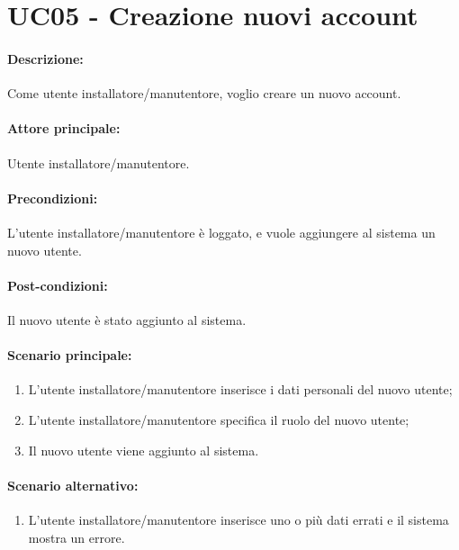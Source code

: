 \section{UC05 - Creazione nuovi account}

\paragraph{Descrizione:}
Come utente installatore/manutentore, voglio creare un nuovo account.

\paragraph{Attore principale:}
Utente installatore/manutentore.

\paragraph{Precondizioni:}
L'utente installatore/manutentore è loggato, e vuole aggiungere al sistema un nuovo utente.

\paragraph{Post-condizioni:}
Il nuovo utente è stato aggiunto al sistema.

\paragraph{Scenario principale:}
\begin{enumerate}
    \item L'utente installatore/manutentore inserisce i dati personali del nuovo utente; %
    \item L'utente installatore/manutentore specifica il ruolo del nuovo utente;
    \item Il nuovo utente viene aggiunto al sistema.
\end{enumerate}

\paragraph{Scenario alternativo:}
\begin{enumerate}
    \item L'utente installatore/manutentore inserisce uno o più dati errati e il sistema mostra un errore.
\end{enumerate}


